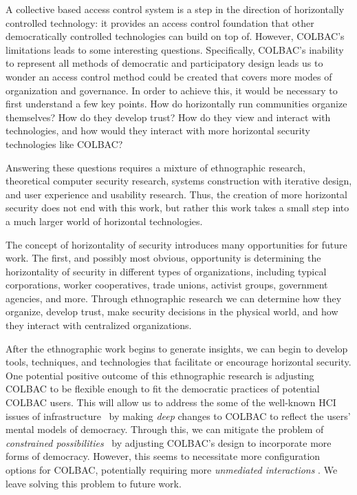 A collective based access control system is a step in the direction of
horizontally controlled technology: it provides an access control foundation
that other democratically controlled technologies can build on top of. However,
COLBAC's limitations leads to some interesting questions. Specifically, COLBAC's
inability to represent all methods of democratic and participatory design leads
us to wonder an access control method could be created that covers more modes of
organization and governance. In order to achieve this, it would be necessary to
first understand a few key points. How do horizontally run communities organize
themselves? How do they develop trust? How do they view and interact with
technologies, and how would they interact with more horizontal security
technologies like COLBAC?

Answering these questions requires a mixture of ethnographic research,
theoretical computer security research, systems construction with iterative
design, and user experience and usability research. Thus, the creation of more
horizontal security does not end with this work, but rather this work takes a
small step into a much larger world of horizontal technologies.

The concept of horizontality of security introduces many opportunities for
future work. The first, and possibly most obvious, opportunity is determining
the horizontality of security in different types of organizations, including
typical corporations, worker cooperatives, trade unions, activist groups,
government agencies, and more. Through ethnographic research we can determine
how they organize, develop trust, make security decisions in the physical world,
and how they interact with centralized organizations. 

After the ethnographic work begins to generate insights, we can begin to develop
tools, techniques, and technologies that facilitate or encourage horizontal
security. One potential positive outcome of this ethnographic research is
adjusting COLBAC to be flexible enough to fit the democratic practices of
potential COLBAC users. This will allow us to address the some of the well-known
HCI issues of infrastructure~\cite{edwards2010infrastructure} by making
\textit{deep} changes to COLBAC to reflect the users' mental models of
democracy. Through this, we can mitigate the problem of \textit{constrained
possibilities}~\cite{edwards2010infrastructure} by adjusting COLBAC's design to
incorporate more forms of democracy. However, this seems to necessitate more
configuration options for COLBAC, potentially requiring more \textit{unmediated
interactions} \cite{edwards2010infrastructure}. We leave solving this problem
to future work.

